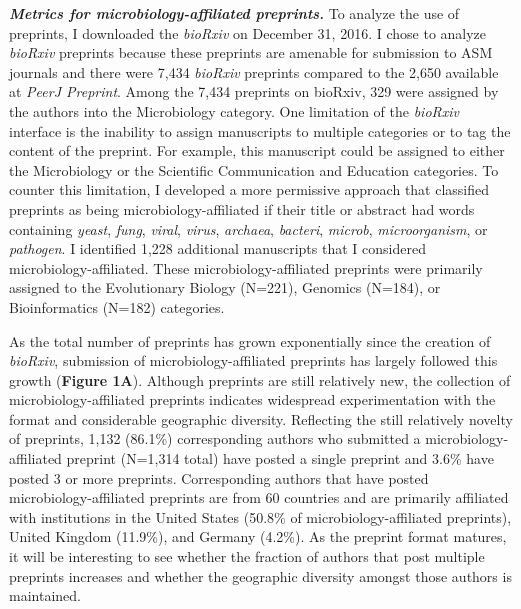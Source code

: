 \documentclass[11pt,]{article}
\begin{document}
\textbf{\emph{Metrics for microbiology-affiliated preprints.}} To
analyze the use of preprints, I downloaded the \emph{bioRxiv} on
December 31, 2016. I chose to analyze \emph{bioRxiv} preprints because
these preprints are amenable for submission to ASM journals and there
were 7,434 \emph{bioRxiv} preprints compared to the 2,650 available at
\emph{PeerJ Preprint}. Among the 7,434 preprints on bioRxiv, 329 were
assigned by the authors into the Microbiology category. One limitation
of the \emph{bioRxiv} interface is the inability to assign manuscripts
to multiple categories or to tag the content of the preprint. For
example, this manuscript could be assigned to either the Microbiology or
the Scientific Communication and Education categories. To counter this
limitation, I developed a more permissive approach that classified
preprints as being microbiology-affiliated if their title or abstract
had words containing \emph{yeast}, \emph{fung}, \emph{viral},
\emph{virus}, \emph{archaea}, \emph{bacteri}, \emph{microb},
\emph{microorganism}, or \emph{pathogen}. I identified 1,228 additional
manuscripts that I considered microbiology-affiliated. These
microbiology-affiliated preprints were primarily assigned to the
Evolutionary Biology (N=221), Genomics (N=184), or Bioinformatics
(N=182) categories.

As the total number of preprints has grown exponentially since the
creation of \emph{bioRxiv}, submission of microbiology-affiliated
preprints has largely followed this growth (\textbf{Figure 1A}).
Although preprints are still relatively new, the collection of
microbiology-affiliated preprints indicates widespread experimentation
with the format and considerable geographic diversity. Reflecting the
still relatively novelty of preprints, 1,132 (86.1\%) corresponding
authors who submitted a microbiology-affiliated preprint (N=1,314 total)
have posted a single preprint and 3.6\% have posted 3 or more preprints.
Corresponding authors that have posted microbiology-affiliated preprints
are from 60 countries and are primarily affiliated with institutions in
the United States (50.8\% of microbiology-affiliated preprints), United
Kingdom (11.9\%), and Germany (4.2\%). As the preprint format matures,
it will be interesting to see whether the fraction of authors that post
multiple preprints increases and whether the geographic diversity
amongst those authors is maintained.
\end{document}
